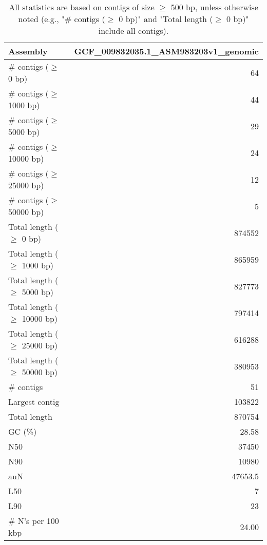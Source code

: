 \documentclass[12pt,a4paper]{article}
\begin{document}
\begin{table}[ht]
\begin{center}
\caption{All statistics are based on contigs of size $\geq$ 500 bp, unless otherwise noted (e.g., "\# contigs ($\geq$ 0 bp)" and "Total length ($\geq$ 0 bp)" include all contigs).}
\begin{tabular}{|l*{1}{|r}|}
\hline
Assembly & GCF\_009832035.1\_ASM983203v1\_genomic \\ \hline
\# contigs ($\geq$ 0 bp) & 64 \\ \hline
\# contigs ($\geq$ 1000 bp) & 44 \\ \hline
\# contigs ($\geq$ 5000 bp) & 29 \\ \hline
\# contigs ($\geq$ 10000 bp) & 24 \\ \hline
\# contigs ($\geq$ 25000 bp) & 12 \\ \hline
\# contigs ($\geq$ 50000 bp) & 5 \\ \hline
Total length ($\geq$ 0 bp) & 874552 \\ \hline
Total length ($\geq$ 1000 bp) & 865959 \\ \hline
Total length ($\geq$ 5000 bp) & 827773 \\ \hline
Total length ($\geq$ 10000 bp) & 797414 \\ \hline
Total length ($\geq$ 25000 bp) & 616288 \\ \hline
Total length ($\geq$ 50000 bp) & 380953 \\ \hline
\# contigs & 51 \\ \hline
Largest contig & 103822 \\ \hline
Total length & 870754 \\ \hline
GC (\%) & 28.58 \\ \hline
N50 & 37450 \\ \hline
N90 & 10980 \\ \hline
auN & 47653.5 \\ \hline
L50 & 7 \\ \hline
L90 & 23 \\ \hline
\# N's per 100 kbp & 24.00 \\ \hline
\end{tabular}
\end{center}
\end{table}
\end{document}
